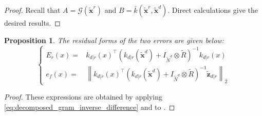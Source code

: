 \documentclass[preprint]{elsarticle}
\newtheorem{proposition}{Proposition}
\begin{document}
\begin{proof}
    Recall that $A=\mathcal{G}(\tilde{\mathbf{x}}^r)$ and $B=\bar{k}(\tilde{\mathbf{x}}^r,\tilde{\mathbf{x}}^d)$. Direct calculations give the desired results.
\end{proof}

\begin{proposition}
    The residual forms of the two errors are given below:
    \begin{equation*}
        \left\{\begin{aligned}
        E_r(x)=&k_{d|r}(x)^\top\left(k_{d|r}(\tilde{\mathbf{x}}^d)+I_{\tilde{N}^d}\otimes\tilde{R}\right)^{-1}k_{d|r}(x)\\
        e_f(x)=&\left\|k_{d|r}(x)^\top\left(k_{d|r}(\tilde{\mathbf{x}}^d)+I_{\tilde{N}^d}\otimes\tilde{R}\right)^{-1}\tilde{\mathbf{z}}_{d|r}\right\|_2
        \end{aligned}\right.
    \end{equation*}\label{th:errors_residual}
    \vspace{-\baselineskip}
\end{proposition}

\begin{proof}
    These expressions are obtained by applying \eqref{eq:decomposed_gram_inverse_difference} and  to .
\end{proof}
\end{document}
